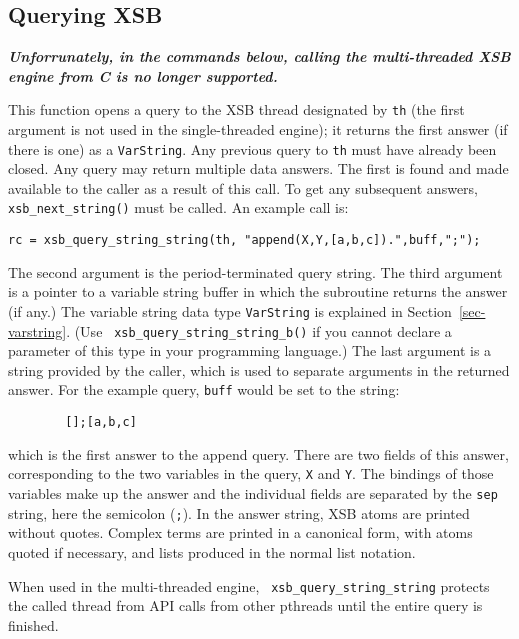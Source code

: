 \subsection{Querying XSB}
           {\bf {\em Unforrunately, in the commands below, calling the
               multi-threaded XSB engine from C is no longer
               supported.}}

\begin{description}
%
This function opens a query to the XSB thread designated by {\tt th}
(the first argument is not used in the single-threaded engine); it
returns the first answer (if there is one) as a {\tt VarString}.  Any
previous query to {\tt th} must have already been closed.  Any query
may return multiple data answers.  The first is found and made
available to the caller as a result of this call.  To get any
subsequent answers, {\tt xsb\_next\_string()} must be called.  An
example call is:
\begin{verbatim}
rc = xsb_query_string_string(th, "append(X,Y,[a,b,c]).",buff,";");
\end{verbatim}
The second argument is the period-terminated query string.  The third
argument is a pointer to a variable string buffer in which the
subroutine returns the answer (if any.) The variable string data type
{\tt VarString} is explained in Section~\ref{sec-varstring}. (Use {\tt
  xsb\_query\_string\_string\_b()} if you cannot declare a parameter
of this type in your programming language.)  The last argument is a
string provided by the caller, which is used to separate arguments in
the returned answer.  For the example query, {\tt buff} would be set
to the string:
\begin{verbatim}
        [];[a,b,c]
\end{verbatim}
which is the first answer to the append query.  There are two fields
of this answer, corresponding to the two variables in the query,
\verb|X| and \verb|Y|.  The bindings of those variables make up the
answer and the individual fields are separated by the \verb|sep|
string, here the semicolon (\verb|;|).  In the answer string, XSB
atoms are printed without quotes.  Complex terms are printed in a
canonical form, with atoms quoted if necessary, and lists produced in
the normal list notation.

When used in the multi-threaded engine, {\tt
  xsb\_query\_string\_string} protects the called thread from API
calls from other pthreads until the entire query is finished.


\end{description}
